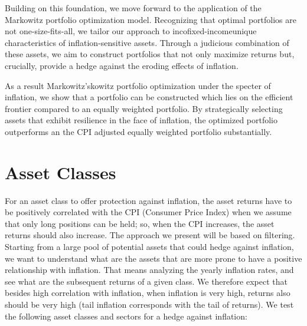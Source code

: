 \documentclass{article}
\begin{document}
Building on this foundation, we move forward to the application of the Markowitz portfolio optimization model. Recognizing that optimal portfolios are not one-size-fits-all, we tailor our approach to incofixed-incomeunique characteristics of inflation-sensitive assets. Through a judicious combination of these assets, we aim to construct portfolios that not only maximize returns but, crucially, provide a hedge against the eroding effects of inflation.

As a result Markowitz'skowitz portfolio optimization under the specter of inflation, we show that a portfolio can be constructed which lies on the efficient frontier compared to an equally weighted portfolio. By strategically selecting assets that exhibit resilience in the face of inflation, the optimized portfolio outperforms an the CPI adjusted equally weighted portfolio substantially.

\newpage


\section{Asset Classes}

For an asset class to offer protection against inflation, the asset returns have to be positively correlated with the CPI (Consumer Price Index) when we assume that only long positions can be held; so, when the CPI increases, the asset returns should also increase. The approach we present will be based on filtering. Starting from a large pool of potential assets that could hedge against inflation, we want to understand what are the assets that are more prone to have a positive relationship with inflation. That means analyzing the yearly inflation rates, and see what are the subsequent returns of a given class. We therefore expect that besides high correlation with inflation, when inflation is very high, returns also should be very high (tail inflation corresponds with the tail of returns). We test the following asset classes and sectors for a hedge against inflation:
\end{document}
